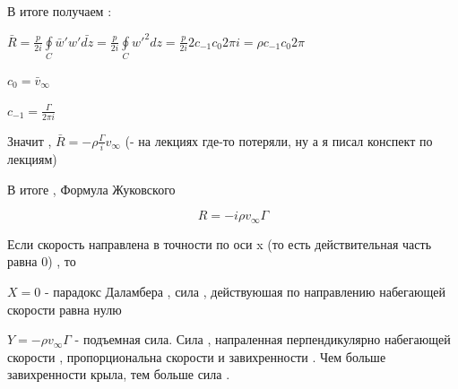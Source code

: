 В итоге получаем : 

$\bar{R} =  \frac{p}{2 i} \oint \limits_{C} \bar{w}'  w'  \bar{d z} =  \frac{p}{2 i} \oint \limits_{C} w'^2 dz =   \frac{p}{2 i} 2 c_{-1} c_0 2 \pi i = \rho c_{-1} c_0 2 \pi$

$ c_0 = \bar{v}_{\infty}$

$c_{-1} = \frac{\Gamma}{2 \pi i} $

Значит , $\bar{R} = - \rho \frac{\Gamma}{i} v_{\infty} $ (- на лекциях где-то потеряли, ну а я писал конспект по лекциям)

В итоге , Формула Жуковского 

$$
R = -i \rho v_{\infty} \Gamma
$$

Если скорость направлена в точности по оси x (то есть действительная часть равна 0) , то 

$X = 0$ - парадокс Даламбера , сила , действуюшая по направлению набегающей скорости равна нулю

$Y = -\rho v_{\infty} \Gamma $ - подъемная сила. Сила , напраленная перпендикулярно набегающей скорости , пропорциональна скорости и завихренности . Чем больше завихренности крыла, тем больше сила . 